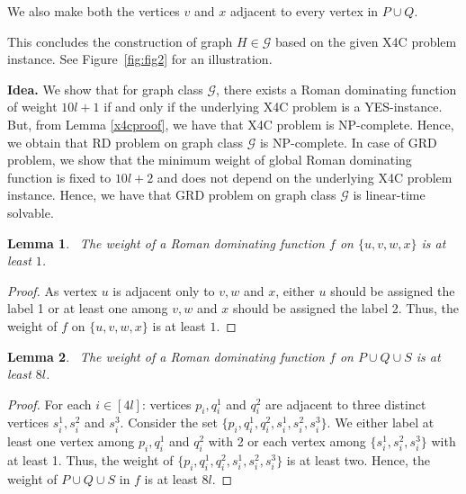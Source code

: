 \documentclass[preprint,12pt]{elsarticle}
\newtheorem{lemma}{Lemma}
\begin{document}
We also make both the vertices $v$ and $x$ adjacent to every vertex in $P \cup Q $.

This concludes the construction of graph $H \in \mathcal{G}$ based on the given X4C problem instance. See Figure~\ref{fig:fig2} for an illustration.

\medskip\noindent
\textbf{Idea.} We show that for graph class $\mathcal{G}$, there exists a Roman dominating function of weight $10l+1$ if and only if the underlying X4C problem is a YES-instance. But, from Lemma \ref{x4cproof}, we have that X4C problem is NP-complete. Hence, we obtain that RD problem on graph class $\mathcal{G}$ is NP-complete. In case of GRD problem, we show that the minimum weight of global Roman dominating function is fixed to $10l+2$ and does not depend on the underlying X4C problem instance. Hence, we have that GRD problem on graph class $\mathcal{G}$ is linear-time solvable.
\begin{lemma}~\label{weight1}
     The weight of a Roman dominating function $f$ on $\{u,v,w,x\}$ is at least $1$.
\end{lemma}
\begin{proof}
As vertex $u$ is adjacent only to $v,w$ and $x$, either $u$ should be assigned the label 1 or at least one among $v,w$ and $x$ should be assigned the label 2. Thus, the weight of $f$ on $\{u,v,w,x\}$ is at least $1$.
\end{proof}
\begin{lemma}~\label{weight8l}
    The weight of a Roman dominating function $f$ on $P \cup Q \cup S$ is at least $8l$.
\end{lemma}
\begin{proof}
    For each $i \in [4l]$: vertices $p_i, q_i^1$ and $q_i^2$  are adjacent to three distinct vertices $s_i^1, s_i^2$ and $s_i^3$. Consider the set $\{p_i, q_i^1, q_i^2, s_i^1, s_i^2, s_i^3\}$. We either label at least one vertex among $p_i, q_i^1$ and $q_i^2$ with 2 or each vertex among $\{s_i^1, s_i^2, s_i^3\}$ with at least 1. Thus, the weight of $\{p_i, q_i^1, q_i^2, s_i^1, s_i^2, s_i^3\}$ is at least two. Hence, the weight of $P \cup Q \cup S$ in $f$ is at least $8l$. 
\end{proof}
\end{document}
